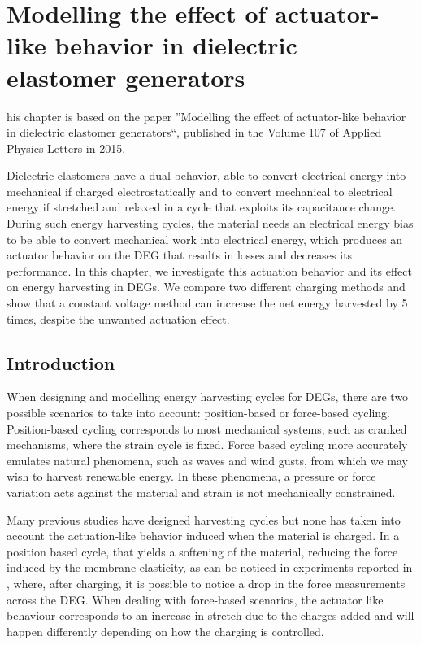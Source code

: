 
\let\textcircled=\pgftextcircled
\chapter{Modelling the effect of actuator-like behavior in dielectric elastomer generators}
\label{chap:1}

his chapter is based on the paper ''Modelling the effect of actuator-like behavior in dielectric elastomer generators``, published in the Volume 107 of Applied Physics Letters in 2015.

Dielectric elastomers have a dual behavior, able to convert electrical energy into mechanical if charged electrostatically and to convert mechanical to electrical energy if stretched and relaxed in a cycle that exploits its capacitance change. During such energy harvesting cycles, the material needs an electrical energy bias to be able to convert mechanical work into electrical energy, which produces an actuator behavior on the DEG that results in losses and decreases its performance. In this chapter, we investigate this actuation behavior and its effect on energy harvesting in DEGs. We compare two different charging methods and show that a constant voltage method can increase the net energy harvested by 5 times, despite the unwanted actuation effect.




\section{Introduction}
\label{sec:intro}

When designing and modelling energy harvesting cycles for DEGs, there are two possible scenarios to take into account: position-based or force-based cycling. Position-based cycling corresponds to most mechanical systems, such as cranked mechanisms, where the strain cycle is fixed. Force based cycling more accurately emulates natural phenomena, such as waves and wind gusts, from which we may wish to harvest renewable energy. In these phenomena, a pressure or force variation acts against the material and strain is not mechanically constrained. 

Many previous studies have designed harvesting cycles\cite{RN85,RN629,Shian2014OptimizingGenerators} but none has taken into account the actuation-like behavior induced when the material is charged. In a position based cycle, that yields a softening of the material, reducing the force induced by the membrane elasticity, as can be noticed in experiments reported in \cite{RN1}, where, after charging, it is possible to notice a drop in the force measurements across the DEG.
When dealing with force-based scenarios, the actuator like behaviour corresponds to an increase in stretch due to the charges added and will happen differently depending on how the charging is controlled.

